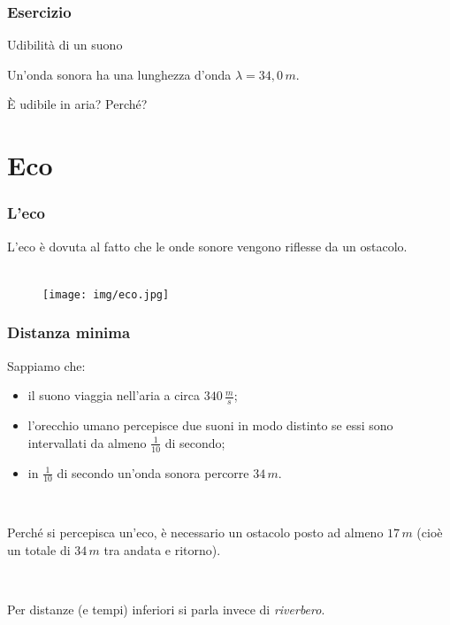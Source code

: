\documentclass[]{beamer}
\theoremstyle{plain}
\begin{document}
\begin{frame}
\frametitle{Esercizio}
\begin{exampleblock}{Udibilità di un suono}
\small{Un'onda sonora ha una lunghezza d'onda $ \lambda = 34,0 \, m $. 

È udibile in aria? Perché?}
\end{exampleblock}
\end{frame}

\section{Eco}

\begin{frame}
\frametitle{L'eco}
L'eco è dovuta al fatto che le onde sonore vengono \alert<1>{riflesse} da un ostacolo.\\~\\
\begin{figure}
\texttt{[image: img/eco.jpg]}
\end{figure}
\end{frame}
\begin{frame}
\frametitle{Distanza minima}
Sappiamo che:
\begin{itemize}
  \item il suono viaggia nell'aria a circa $ 340 \, \frac{m}{s} $;\pause
  \item l'orecchio umano percepisce due suoni in modo distinto se essi sono intervallati da almeno $ \frac{1}{10} $ di secondo;\pause
  \item in $ \frac{1}{10} $ di secondo un'onda sonora percorre $ 34\, m $.\pause
\end{itemize}

~

Perché si percepisca un'eco, \alert{è necessario un ostacolo posto ad almeno $ 17 \, m $} (cioè un totale di $ 34 \, m $ tra andata e ritorno).\pause

~

Per distanze (e tempi) inferiori si parla invece di \emph{riverbero}.
\end{frame}
\end{document}
